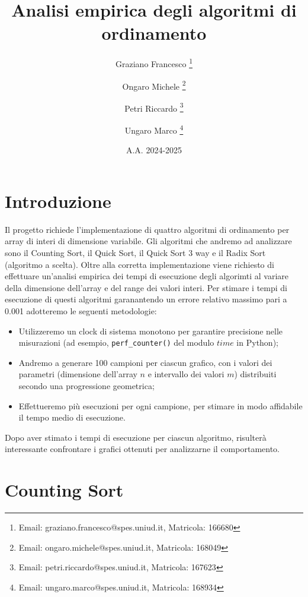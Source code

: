 \documentclass[a4paper, 12pt, oneside]{book}
\title{Analisi empirica degli algoritmi di ordinamento}
\author[ ]{Graziano Francesco \thanks{Email: graziano.francesco@spes.uniud.it, Matricola: 166680}}
\author[ ]{Ongaro Michele \thanks{Email: ongaro.michele@spes.uniud.it, Matricola: 168049}}
\author[ ]{Petri Riccardo \thanks{Email: petri.riccardo@spes.uniud.it, Matricola: 167623}}
\author[ ]{Ungaro Marco \thanks{Email: ungaro.marco@spes.uniud.it, Matricola: 168934}}
\affil[ ]{Università degli Studi di Udine, Dipartimento di Scienze matematiche, informatiche e fisiche}
\date{A.A. 2024-2025}
\begin{document}
\renewcommand{\contentsname}{Contenuti}
\renewcommand{\chaptername}{Capitolo}

\maketitle %
\tableofcontents %

\chapter{Introduzione}\label{chap:Introduzione} %

Il progetto richiede l'implementazione di quattro algoritmi di ordinamento per array di interi di dimensione variabile.
Gli algoritmi che andremo ad analizzare sono il Counting Sort, il Quick Sort, il Quick Sort 3 way e il Radix Sort (algoritmo a scelta).
Oltre alla corretta implementazione viene richiesto di effettuare un'analisi empirica dei tempi di esecuzione degli algorimti al variare della dimensione dell'array e del range dei valori interi. Per stimare i tempi di esecuzione di questi algoritmi garanantendo un errore relativo massimo pari a 0.001 adotteremo le seguenti metodologie:

\begin{itemize}
    \item Utilizzeremo un clock di sistema monotono per garantire precisione nelle misurazioni (ad esempio, \texttt{perf\_counter()} del modulo \(time\) in Python);
    \item Andremo a generare 100 campioni per ciascun grafico, con i valori dei parametri (dimensione dell'array \(n\) e intervallo dei valori \(m\)) distribuiti secondo una progressione geometrica;
    \item Effettueremo più esecuzioni per ogni campione, per stimare in modo affidabile il tempo medio di esecuzione.
\end{itemize}

\noindent Dopo aver stimato i tempi di esecuzione per ciascun algoritmo, risulterà interessante confrontare i grafici ottenuti per analizzarne il comportamento. 



 
\chapter{Counting Sort}\label{chap:Counting Sort} %
\end{document}
